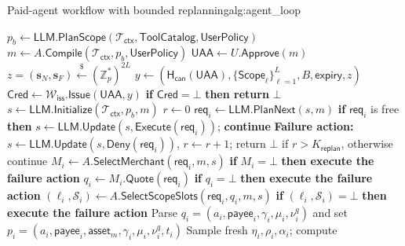 \documentclass[letterpaper]{article}
\newcommand{\hash}{\mathsf{H}_{\mathsf{can}}}
\newcommand{\Zp}{\mathbb{Z}_p}
\begin{document}
\begin{MMAppendixAlgorithm}{Paid-agent workflow with bounded replanning}{alg:agent_loop}

\State \(p_b \leftarrow
\mathsf{LLM.PlanScope}(\mathcal{T}_{\mathsf{ctx}},\mathsf{ToolCatalog},
\mathsf{UserPolicy})\)
\State \(m \leftarrow A.\mathsf{Compile}
(\mathcal{T}_{\mathsf{ctx}},p_b,\mathsf{UserPolicy})\)
\State $\mathsf{UAA} \leftarrow U.\mathsf{Approve}(m)$
\State $z=(\mathbf s_N,\mathbf s_F)
  \stackrel{\$}{\leftarrow}(\Zp^\ast)^{2L}$
\State $y\leftarrow
(\hash(\mathsf{UAA}),\{\mathsf{Scope}_\ell\}_{\ell=1}^{L},B,
\mathsf{expiry},z)$
\State $\mathsf{Cred} \leftarrow
\mathcal{W}_{\mathsf{iss}}.\mathsf{Issue}(\mathsf{UAA},y)$
\State \textbf{if} \(\mathsf{Cred}=\bot\) \textbf{then return} \(\bot\)
\State \(s \leftarrow \mathsf{LLM.Initialize}
(\mathcal{T}_{\mathsf{ctx}},p_b,m)\)
\State \(r\leftarrow 0\)
    \State $\mathsf{req}_i \leftarrow
    \mathsf{LLM.PlanNext}(s,m)$
    \State \textbf{if} \(\mathsf{req}_i\) is free \textbf{then}
    \State
      \(s\leftarrow\mathsf{LLM.Update}(s,\mathsf{Execute}(\mathsf{req}_i))\);
      \textbf{continue}
    \Statex \hspace{\algorithmicindent}\textbf{Failure action:}
      \(s\leftarrow\mathsf{LLM.Update}(s,\mathsf{Deny}(\mathsf{req}_i))\),
      \(r\leftarrow r+1\); return \(\bot\) if
      \(r>K_{\mathsf{replan}}\), otherwise continue
    \State \(M_i\leftarrow
    A.\mathsf{SelectMerchant}(\mathsf{req}_i,m,s)\)
    \State \textbf{if} \(M_i=\bot\)
      \textbf{then execute the failure action}
    \State $q_i \leftarrow M_i.\mathsf{Quote}(\mathsf{req}_i)$
    \State \textbf{if} \(q_i=\bot\)
      \textbf{then execute the failure action}
    \State \((\ell_i,\mathcal S_i)\leftarrow
    A.\mathsf{SelectScopeSlots}(\mathsf{req}_i,q_i,m,s)\)
    \State \textbf{if} \((\ell_i,\mathcal S_i)=\bot\)
      \textbf{then execute the failure action}
    \State Parse \(q_i=(a_i,\mathsf{payee}_i,\gamma_i,\mu_i,\nu_i^q)\) and
      set \(p_i=(a_i,\mathsf{payee}_i,\mathsf{asset}_m,
      \gamma_i,\mu_i,\nu_i^q,t_i)\)
    \State Sample fresh \(\eta_i,\rho_i,\alpha_i\); compute

\end{MMAppendixAlgorithm}
\end{document}
